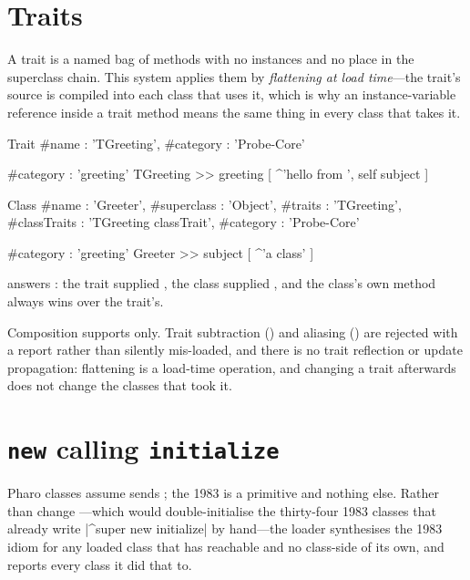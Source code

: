 \section{Traits}

A trait is a named bag of methods with no instances and no place in the
superclass chain. This system applies them by \emph{flattening at load
time}---the trait's source is compiled into each class that uses it, which is
why an instance-variable reference inside a trait method means the same thing
in every class that takes it.

\begin{st}
Trait {
	#name : 'TGreeting',
	#category : 'Probe-Core'
}

{ #category : 'greeting' }
TGreeting >> greeting [
	^'hello from ', self subject
]
\end{st}

\begin{st}
Class {
	#name : 'Greeter',
	#superclass : 'Object',
	#traits : 'TGreeting',
	#classTraits : 'TGreeting classTrait',
	#category : 'Probe-Core'
}

{ #category : 'greeting' }
Greeter >> subject [
	^'a class'
]
\end{st}

 answers : the trait supplied
, the class supplied , and the class's own method
always wins over the trait's.

Composition supports \ct{+} only. Trait subtraction (\ct{-}) and aliasing
() are rejected with a report rather than silently mis-loaded, and there
is no trait reflection or update propagation: flattening is a load-time
operation, and changing a trait afterwards does not change the classes that
took it.

\section{\texttt{new} calling \texttt{initialize}}

Pharo classes assume  sends ; the 1983
 is a primitive and nothing else. Rather than change
---which would double-initialise the thirty-four 1983
classes that already write \ct|^super new initialize| by hand---the loader
synthesises the 1983 idiom for any loaded class that has 
reachable and no class-side  of its own, and reports every class it
did that to.

